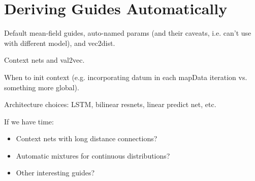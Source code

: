 \section{Deriving Guides Automatically}
\label{sec:autoGuide}

Default mean-field guides, auto-named params (and their caveats, i.e. can't use with different model), and vec2dist.

Context nets and val2vec.

When to init context (e.g. incorporating datum in each mapData iteration vs. something more global).

Architecture choices: LSTM, bilinear resnets, linear predict net, etc.

If we have time:
\begin{itemize}
\item{Context nets with long distance connections?}
\item{Automatic mixtures for continuous distributions?}
\item{Other interesting guides?}
\end{itemize}


